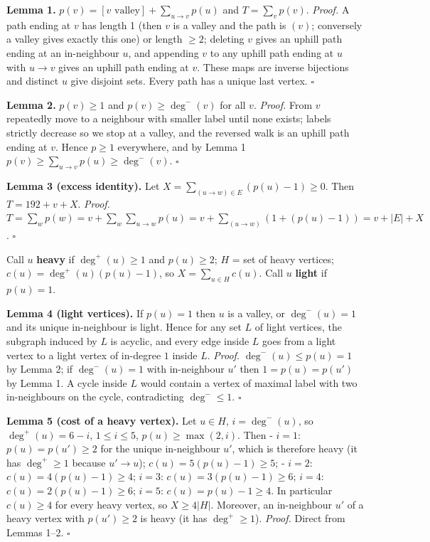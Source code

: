 \documentclass[11pt,a4paper]{article}
\begin{document}
\textbf{Lemma 1.} \(p(v)=[v\text{ valley}]+\sum_{u\to v}p(u)\) and
\(T=\sum_v p(v)\). \emph{Proof.} A path ending at \(v\) has length 1
(then \(v\) is a valley and the path is \((v)\); conversely a valley
gives exactly this one) or length \(\ge2\); deleting \(v\) gives an
uphill path ending at an in-neighbour \(u\), and appending \(v\) to any
uphill path ending at \(u\) with \(u\to v\) gives an uphill path ending
at \(v\). These maps are inverse bijections and distinct \(u\) give
disjoint sets. Every path has a unique last vertex. \(\square\)

\textbf{Lemma 2.} \(p(v)\ge1\) and \(p(v)\ge\deg^-(v)\) for all \(v\).
\emph{Proof.} From \(v\) repeatedly move to a neighbour with smaller
label until none exists; labels strictly decrease so we stop at a
valley, and the reversed walk is an uphill path ending at \(v\). Hence
\(p\ge1\) everywhere, and by Lemma 1
\(p(v)\ge\sum_{u\to v}p(u)\ge\deg^-(v)\). \(\square\)

\textbf{Lemma 3 (excess identity).} Let
\(X=\sum_{(u\to w)\in E}(p(u)-1)\ge0\). Then \(T=192+v+X\).
\emph{Proof.}
\(T=\sum_w p(w)=v+\sum_w\sum_{u\to w}p(u)=v+\sum_{(u\to w)}(1+(p(u)-1))=v+|E|+X\).
\(\square\)

Call \(u\) \textbf{heavy} if \(\deg^+(u)\ge1\) and \(p(u)\ge2\); \(H\) =
set of heavy vertices; \(c(u)=\deg^+(u)(p(u)-1)\), so
\(X=\sum_{u\in H}c(u)\). Call \(u\) \textbf{light} if \(p(u)=1\).

\textbf{Lemma 4 (light vertices).} If \(p(u)=1\) then \(u\) is a valley,
or \(\deg^-(u)=1\) and its unique in-neighbour is light. Hence for any
set \(L\) of light vertices, the subgraph induced by \(L\) is acyclic,
and every edge inside \(L\) goes from a light vertex to a light vertex
of in-degree \(1\) inside \(L\). \emph{Proof.} \(\deg^-(u)\le p(u)=1\)
by Lemma 2; if \(\deg^-(u)=1\) with in-neighbour \(u'\) then
\(1=p(u)=p(u')\) by Lemma 1. A cycle inside \(L\) would contain a vertex
of maximal label with two in-neighbours on the cycle, contradicting
\(\deg^-\le1\). \(\square\)

\textbf{Lemma 5 (cost of a heavy vertex).} Let \(u\in H\),
\(i=\deg^-(u)\), so \(\deg^+(u)=6-i\), \(1\le i\le5\),
\(p(u)\ge\max(2,i)\). Then - \(i=1\): \(p(u)=p(u')\ge2\) for the unique
in-neighbour \(u'\), which is therefore heavy (it has \(\deg^+\ge1\)
because \(u'\to u\)); \(c(u)=5(p(u)-1)\ge5\); - \(i=2\):
\(c(u)=4(p(u)-1)\ge4\); \(i=3\): \(c(u)=3(p(u)-1)\ge6\); \(i=4\):
\(c(u)=2(p(u)-1)\ge6\); \(i=5\): \(c(u)=p(u)-1\ge4\). In particular
\(c(u)\ge4\) for every heavy vertex, so \(X\ge4|H|\). Moreover, an
in-neighbour \(u'\) of a heavy vertex with \(p(u')\ge2\) is heavy (it
has \(\deg^+\ge1\)). \emph{Proof.} Direct from Lemmas 1--2. \(\square\)
\end{document}
